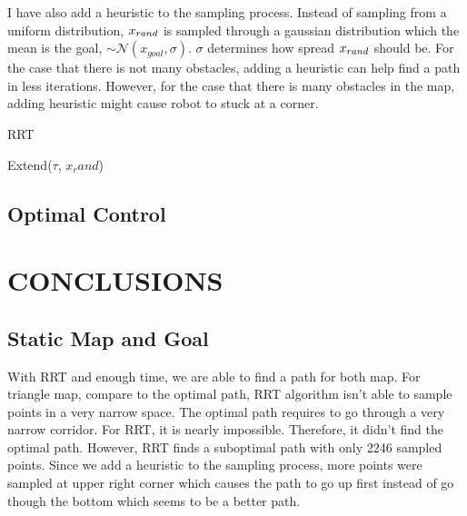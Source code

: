 \documentclass[letterpaper, 10 pt, conference]{ieeeconf}  %
\begin{document}
I have also add a heuristic to the sampling process. Instead of sampling from a uniform distribution, $x_{rand}$ is sampled through 
a gaussian distribution which the mean is the goal, $\sim \mathcal{N}(x_{goal}, \sigma)$. $\sigma$ determines how spread 
$x_{rand}$ should be. For the case that there is not many obstacles, adding a heuristic can help find a path in less iterations. However, 
for the case that there is many obstacles in the map, adding heuristic might cause robot to stuck at a corner. 

\begin{algorithm}[H]
\caption{RRT}\label{alg:RRT1}
\begin{algorithmic}[1]
\EndFor
\end{algorithmic}
\end{algorithm}

\begin{algorithm}[H]
\caption{Extend($\tau$, $x_rand$)}\label{alg:RRTe}
\begin{algorithmic}[1]
\EndIf
\EndIf
\end{algorithmic}
\end{algorithm}


\subsection{Optimal Control}


\section{CONCLUSIONS}
\subsection{Static Map and Goal}
With RRT and enough time, we are able to find a path for both map. For triangle map, compare to the optimal path, RRT algorithm
isn't able to sample points in a very narrow space. The optimal path requires to go through a very narrow corridor. For RRT, it is 
nearly impossible. Therefore, it didn't find the optimal path. However, RRT finds a suboptimal path with only 2246
sampled points. Since we add a heuristic to the sampling process, more points were sampled at upper right corner which causes the
path to go up first instead of go though the bottom which seems to be a better path. \\
\end{document}
